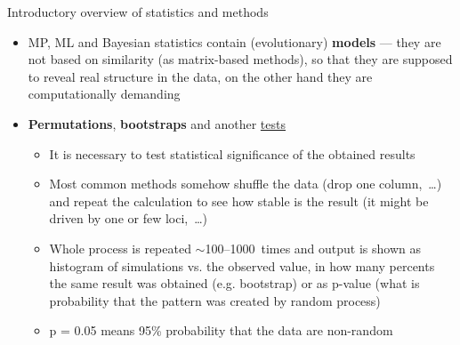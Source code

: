 \documentclass[compress, xelatex, 11pt, xcolor=svgnames, aspectratio=169, url={hyphens, lowtilde}]{beamer}
\begin{document}
\begin{frame}[allowframebreaks]{Introductory overview of statistics and methods}
\begin{itemize}
\begin{itemize}
\begin{itemize}
			\end{itemize}
		\end{itemize}
		\item MP, ML and Bayesian statistics contain (evolutionary) \textbf{models} --- they are not based on similarity (as matrix-based methods), so that they are supposed to reveal real structure in the data, on the other hand they are computationally demanding
		\item \textbf{Permutations}, \textbf{bootstraps} and another \href{https://en.wikipedia.org/wiki/Resampling_(statistics)}{tests}
		\begin{itemize}
			\item It is necessary to test statistical significance of the obtained results
			\item Most common methods somehow shuffle the data (drop one column,~\ldots) and repeat the calculation to see how stable is the result (it might be driven by one or few loci,~\ldots)
			\item Whole process is repeated $\sim$100--1000~times and output is shown as histogram of simulations vs. the observed value, in how many percents the same result was obtained (e.g. bootstrap) or as p-value (what is probability that the pattern was created by random process)
			\item p = 0.05 means 95\% probability that the data are non-random
		\end{itemize}
	\end{itemize}
\end{frame}
\end{document}
